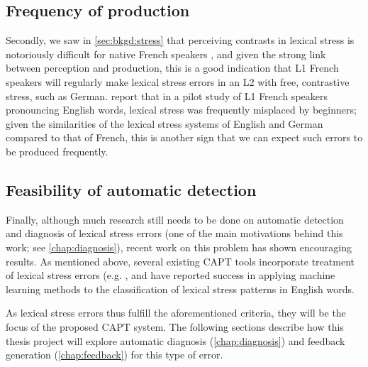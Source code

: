 		\subsection{Frequency of production}
		\label{sec:targeting:frequency}

Secondly, we saw in \cref{sec:bkgd:stress} that perceiving contrasts in lexical stress is notoriously difficult for native French speakers \citep{Cutler2005,Dupoux2008}, and given the strong link between perception and production,
this is a good indication that L1 French speakers will regularly make lexical stress errors in an L2 with free, contrastive stress, such as German. \textcite{Bonneau2011} report that in a pilot study of L1 French speakers pronouncing English words, lexical stress was frequently misplaced by beginners; given the similarities of the lexical stress systems of English and German compared to that of French, this is another sign that we can expect such errors to be produced frequently.
%
%	

		\subsection{Feasibility of automatic detection}
		\label{sec:targeting:autodetect}

Finally, although much research still needs to be done on automatic detection and diagnosis of lexical stress errors (one of the main motivations behind this work; see \cref{chap:diagnosis}), recent work on this problem has shown encouraging results. As mentioned above, several existing CAPT tools incorporate treatment of lexical stress errors (e.g. \cite{Wik2009,Bonneau2011}, and \textcite{Shahin2012a,Kim2011} have reported success in applying machine learning methods to the classification of lexical stress patterns in English words. 





	As lexical stress errors thus fulfill the aforementioned criteria, they will  be the focus of the proposed CAPT system. The following sections describe how this thesis project will explore  automatic diagnosis (\cref{chap:diagnosis}) and feedback generation (\cref{chap:feedback}) for this type of error.		
		
